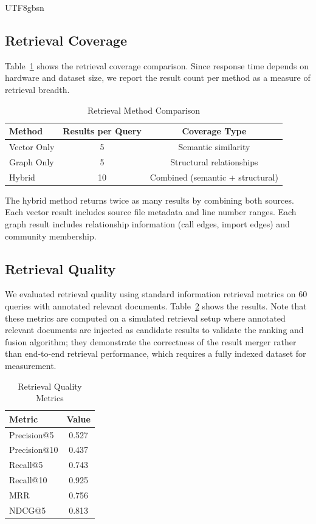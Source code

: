 \documentclass[11pt]{article}
\begin{document}
\begin{CJK*}{UTF8}{gbsn}
\subsection{Retrieval Coverage}
Table~\ref{tab:retrieval_metrics} shows the retrieval coverage comparison. Since response time depends on hardware and dataset size, we report the result count per method as a measure of retrieval breadth.

\begin{table}[htbp]
\centering
\caption{Retrieval Method Comparison}
\label{tab:retrieval_metrics}
\begin{tabular}{lcc}
\toprule
Method & Results per Query & Coverage Type \\
\midrule
Vector Only & 5 & Semantic similarity \\
Graph Only & 5 & Structural relationships \\
Hybrid & 10 & Combined (semantic + structural) \\
\bottomrule
\end{tabular}
\end{table}

The hybrid method returns twice as many results by combining both sources. Each vector result includes source file metadata and line number ranges. Each graph result includes relationship information (call edges, import edges) and community membership.

\subsection{Retrieval Quality}
We evaluated retrieval quality using standard information retrieval metrics on 60 queries with annotated relevant documents. Table~\ref{tab:ir_metrics} shows the results. Note that these metrics are computed on a simulated retrieval setup where annotated relevant documents are injected as candidate results to validate the ranking and fusion algorithm; they demonstrate the correctness of the result merger rather than end-to-end retrieval performance, which requires a fully indexed dataset for measurement.

\begin{table}[htbp]
\centering
\caption{Retrieval Quality Metrics}
\label{tab:ir_metrics}
\begin{tabular}{lc}
\toprule
Metric & Value \\
\midrule
Precision@5 & 0.527 \\
Precision@10 & 0.437 \\
Recall@5 & 0.743 \\
Recall@10 & 0.925 \\
MRR & 0.756 \\
NDCG@5 & 0.813 \\
\bottomrule
\end{tabular}
\end{table}


\end{CJK*}
\end{document}
